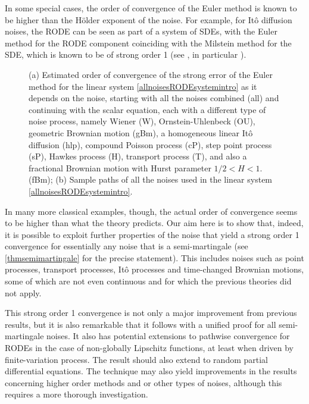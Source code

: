 \documentclass[reqno,12pt]{amsart}
\theoremstyle{plain} %
\theoremstyle{definition} %
\begin{document}
In some special cases, the order of convergence of the Euler method is known to be higher than the H\"older exponent of the noise. For example, for It\^o diffusion noises, the RODE can be seen as part of a system of SDEs, with the Euler method for the RODE component coinciding with the Milstein method for the SDE, which is known to be of strong order 1 (see \cite[Section 5]{WangCaoHanKloeden2021}, in particular \cite[Section 5.2, Example 12 and Remark 13]{WangCaoHanKloeden2021}).

\begin{figure}[htb]
    \caption{(a) Estimated order of convergence of the strong error of the Euler method for the linear system \cref{allnoisesRODEsystemintro} as it depends on the noise, starting with all the noises combined (all) and continuing with the scalar equation, each with a different type of noise process, namely Wiener (W), Ornstein-Uhlenbeck (OU), geometric Brownian motion (gBm), a homogeneous linear It\^o diffusion (hlp), compound Poisson process (cP), step point process (sP), Hawkes process (H), transport process (T), and also a fractional Brownian motion with Hurst parameter $1/2 < H < 1.$ (fBm); (b) Sample paths of all the noises used in the linear system \cref{allnoisesRODEsystemintro}.}
    \label{figallnoisesintro}
\end{figure}

In many more classical examples, though, the actual order of convergence seems to be higher than what the theory predicts. Our aim here is to show that, indeed, it is possible to exploit further properties of the noise that yield a strong order 1 convergence for essentially any noise that is a semi-martingale (see \cref{thmsemimartingale} for the precise statement). This includes noises such as point processes, transport processes, It\^o processes and time-changed Brownian motions, some of which are not even continuous and for which the previous theories did not apply.

This strong order 1 convergence is not only a major improvement from previous results, but it is also remarkable that it follows with a unified proof for all semi-martingale noises. It also has potential extensions to pathwise convergence for RODEs in the case of non-globally Lipschitz functions, at least when driven by finite-variation process. The result should also extend to random partial differential equations. The technique may also yield improvements in the results concerning higher order methods and or other types of noises, although this requires a more thorough investigation.
\end{document}
